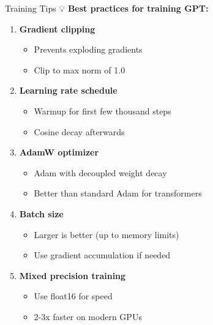 \documentclass[aspectratio=169]{beamer}
\begin{document}
\begin{frame}[shrink=10]{Training Tips 💡}
    \textbf{Best practices for training GPT:}

    \vspace{0.3cm}

    \begin{enumerate}\setlength{\itemsep}{0pt}
        \item \textbf{Gradient clipping}
        \begin{itemize}\setlength{\itemsep}{0pt}
            \item Prevents exploding gradients
            \item Clip to max norm of 1.0
        \end{itemize}

        \item \textbf{Learning rate schedule}
        \begin{itemize}\setlength{\itemsep}{0pt}
            \item Warmup for first few thousand steps
            \item Cosine decay afterwards
        \end{itemize}

        \item \textbf{AdamW optimizer}
        \begin{itemize}\setlength{\itemsep}{0pt}
            \item Adam with decoupled weight decay
            \item Better than standard Adam for transformers
        \end{itemize}

        \item \textbf{Batch size}
        \begin{itemize}\setlength{\itemsep}{0pt}
            \item Larger is better (up to memory limits)
            \item Use gradient accumulation if needed
        \end{itemize}

        \item \textbf{Mixed precision training}
        \begin{itemize}\setlength{\itemsep}{0pt}
            \item Use float16 for speed
            \item 2-3x faster on modern GPUs
        \end{itemize}
    \end{enumerate}
\end{frame}
\end{document}
